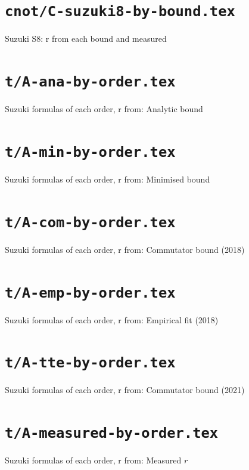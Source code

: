 \documentclass{article}
\begin{document}
\section*{\texttt{cnot/C-suzuki8-by-bound.tex}}
Suzuki S8: r from each bound and measured\par\medskip

\clearpage

\section*{\texttt{t/A-ana-by-order.tex}}
Suzuki formulas of each order, r from: Analytic bound\par\medskip

\clearpage

\section*{\texttt{t/A-min-by-order.tex}}
Suzuki formulas of each order, r from: Minimised bound\par\medskip

\clearpage

\section*{\texttt{t/A-com-by-order.tex}}
Suzuki formulas of each order, r from: Commutator bound (2018)\par\medskip

\clearpage

\section*{\texttt{t/A-emp-by-order.tex}}
Suzuki formulas of each order, r from: Empirical fit (2018)\par\medskip

\clearpage

\section*{\texttt{t/A-tte-by-order.tex}}
Suzuki formulas of each order, r from: Commutator bound (2021)\par\medskip

\clearpage

\section*{\texttt{t/A-measured-by-order.tex}}
Suzuki formulas of each order, r from: Measured $r$\par\medskip

\clearpage
\end{document}
